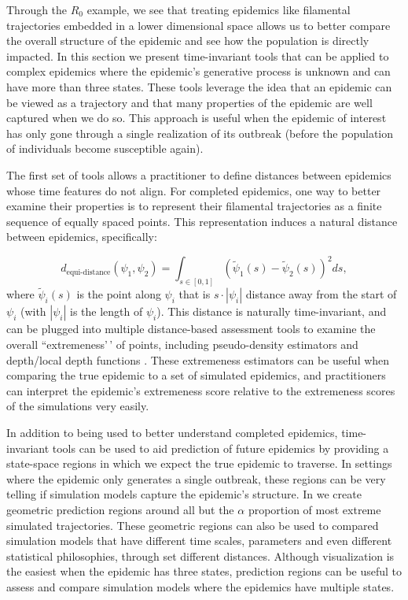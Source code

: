 \documentclass[
  shortnames]{jss}
\begin{document}
Through the \(R_0\) example, we see that treating epidemics like
filamental trajectories embedded in a lower dimensional space allows us
to better compare the overall structure of the epidemic and see how the
population is directly impacted. In this section we present
time-invariant tools that can be applied to complex epidemics where the
epidemic's generative process is unknown and can have more than three
states. These tools leverage the idea that an epidemic can be viewed as
a trajectory and that many properties of the epidemic are well captured
when we do so. This approach is useful when the epidemic of interest has
only gone through a single realization of its outbreak (before the
population of individuals become susceptible again).

The first set of tools allows a practitioner to define distances between
epidemics whose time features do not align. For completed epidemics, one
way to better examine their properties is to represent their filamental
trajectories as a finite sequence of equally spaced points. This
representation induces a natural distance between epidemics,
specifically:

\[
d_\text{equi-distance}(\psi_1, \psi_2)  = \int_{s \in [0,1]} (\tilde{\psi}_1(s) - \tilde{\psi}_2(s))^2 ds \nonumber,
\] where \(\tilde{\psi}_i(s)\) is the point along \(\psi_i\) that is
\(s\cdot|\psi_i|\) distance away from the start of \(\psi_i\) (with
\(|\psi_i|\) is the length of \(\psi_i\)). This distance is naturally
time-invariant, and can be plugged into multiple distance-based
assessment tools to examine the overall ``extremeness'\,' of points,
including pseudo-density estimators and depth/local depth functions
\citep[for examples see][]{Ciollaro2016, Geenens2017}. These extremeness
estimators can be useful when comparing the true epidemic to a set of
simulated epidemics, and practitioners can interpret the epidemic's
extremeness score relative to the extremeness scores of the simulations
very easily.

In addition to being used to better understand completed epidemics,
time-invariant tools can be used to aid prediction of future epidemics
by providing a state-space regions in which we expect the true epidemic
to traverse. In settings where the epidemic only generates a single
outbreak, these regions can be very telling if simulation models capture
the epidemic's structure. In  we create geometric
prediction regions around all but the \(\alpha\) proportion of most
extreme simulated trajectories. These geometric regions can also be used
to compared simulation models that have different time scales,
parameters and even different statistical philosophies, through set
different distances. Although visualization is the easiest when the
epidemic has three states, prediction regions can be useful to assess
and compare simulation models where the epidemics have multiple states.
\end{document}
